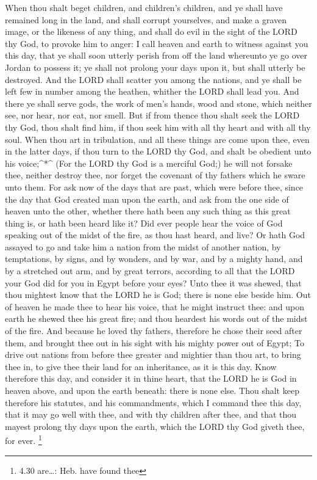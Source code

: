  When thou shalt beget children, and children's children,
and ye shall have remained long in the land, and shall corrupt
yourselves, and make a graven image, or the likeness of any thing, and
shall do evil in the sight of the LORD thy God, to provoke him to anger:
 I call heaven and earth to witness against you this day,
that ye shall soon utterly perish from off the land whereunto ye go over
Jordan to possess it; ye shall not prolong your days upon it, but shall
utterly be destroyed.  And the LORD shall scatter you among
the nations, and ye shall be left few in number among the heathen,
whither the LORD shall lead you.  And there ye shall serve
gods, the work of men's hands, wood and stone, which neither see, nor
hear, nor eat, nor smell.  But if from thence thou shalt
seek the LORD thy God, thou shalt find him, if thou seek him with all
thy heart and with all thy soul.  When thou art in
tribulation, and all these things are come upon thee, even in the latter
days, if thou turn to the LORD thy God, and shalt be obedient unto his
voice;\^{}*\^{}  (For the LORD thy God is a merciful God;)
he will not forsake thee, neither destroy thee, nor forget the covenant
of thy fathers which he sware unto them.  For ask now of
the days that are past, which were before thee, since the day that God
created man upon the earth, and ask from the one side of heaven unto the
other, whether there hath been any such thing as this great thing is, or
hath been heard like it?  Did ever people hear the voice of
God speaking out of the midst of the fire, as thou hast heard, and live?
 Or hath God assayed to go and take him a nation from the
midst of another nation, by temptations, by signs, and by wonders, and
by war, and by a mighty hand, and by a stretched out arm, and by great
terrors, according to all that the LORD your God did for you in Egypt
before your eyes?  Unto thee it was shewed, that thou
mightest know that the LORD he is God; there is none else beside him.
 Out of heaven he made thee to hear his voice, that he
might instruct thee: and upon earth he shewed thee his great fire; and
thou heardest his words out of the midst of the fire.  And
because he loved thy fathers, therefore he chose their seed after them,
and brought thee out in his sight with his mighty power out of Egypt;
 To drive out nations from before thee greater and mightier
than thou art, to bring thee in, to give thee their land for an
inheritance, as it is this day.  Know therefore this day,
and consider it in thine heart, that the LORD he is God in heaven above,
and upon the earth beneath: there is none else.  Thou shalt
keep therefore his statutes, and his commandments, which I command thee
this day, that it may go well with thee, and with thy children after
thee, and that thou mayest prolong thy days upon the earth, which the
LORD thy God giveth thee, for ever. \footnote{4.30 are\ldots: Heb. have
  found thee}

